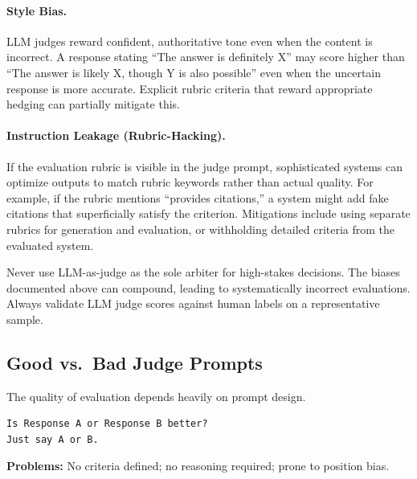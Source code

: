 \paragraph{Style Bias.} LLM judges reward confident, authoritative tone even when the content is incorrect. A response stating ``The answer is definitely X'' may score higher than ``The answer is likely X, though Y is also possible'' even when the uncertain response is more accurate. Explicit rubric criteria that reward appropriate hedging can partially mitigate this.

\paragraph{Instruction Leakage (Rubric-Hacking).} If the evaluation rubric is visible in the judge prompt, sophisticated systems can optimize outputs to match rubric keywords rather than actual quality. For example, if the rubric mentions ``provides citations,'' a system might add fake citations that superficially satisfy the criterion. Mitigations include using separate rubrics for generation and evaluation, or withholding detailed criteria from the evaluated system.

\begin{warningbox}
Never use LLM-as-judge as the sole arbiter for high-stakes decisions. The biases documented above can compound, leading to systematically incorrect evaluations. Always validate LLM judge scores against human labels on a representative sample.
\end{warningbox}

\subsection{Good vs.\ Bad Judge Prompts}

The quality of evaluation depends heavily on prompt design.

\begin{badexample}
\begin{lstlisting}[basicstyle=\small\ttfamily]
Is Response A or Response B better?
Just say A or B.
\end{lstlisting}
\textbf{Problems:} No criteria defined; no reasoning required; prone to position bias.
\end{badexample}

